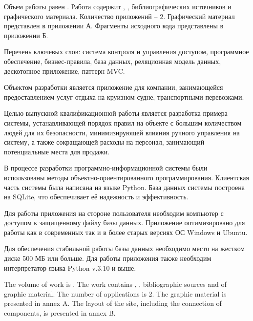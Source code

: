 
Объем работы равен . Работа содержит , ,  библиографических источников и  графического материала. Количество приложений – 2. Графический материал представлен в приложении А. Фрагменты исходного кода представлены в приложении Б.

Перечень ключевых слов: система контроля и управления доступом, программное обеспечение, бизнес-правила, база данных, реляционная модель данных, дескотопное приложение, паттерн MVC.

Объектом разработки является приложение для компании,  занимающейся предоставлением услуг отдыха на круизном судне, транспортными перевозками.

Целью выпускной квалификационной работы является разработка примера системы, устанавливающей порядок правил на объекте с большим количеством людей для их безопасности, минимизирующей влияния ручного управления на систему, а также сокращающей расходы на персонал, занимающий потенциальные места для продажи.

В процессе разработки программно-информационной системы были использованы методы объектно-ориентированного программирования. Клиентская часть системы была написана на языке Python. База данных системы построена на SQLite, что обеспечивает её надежность и эффективность.

Для работы приложения на стороне пользователя необходим компьютер с доступом к защищенному файлу базы данных. Приложение оптимизировано для работы как в современных так и в более старых версиях ОС Windows и Ubuntu.

Для обеспечения стабильной работы базы данных необходимо место на жестком диске 500 МБ или больше. Для работы приложения также необходим интерпретатор языка Python v.3.10 и выше.

  
The volume of work is . The work contains , ,  bibliographic sources and  of graphic material. The number of applications is 2. The graphic material is presented in annex A. The layout of the site, including the connection of components, is presented in annex B.

